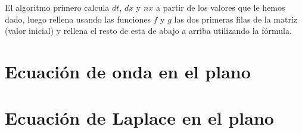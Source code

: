 El algoritmo primero calcula $dt$, $dx$ y $nx$ a partir de los valores que le hemos dado, luego rellena usando las funciones $f$ y $g$ las dos primeras filas de la matriz (valor inicial) y rellena el resto de esta de abajo a arriba utilizando la fórmula.

\section{Ecuación de onda en el plano}

\section{Ecuación de Laplace en el plano}